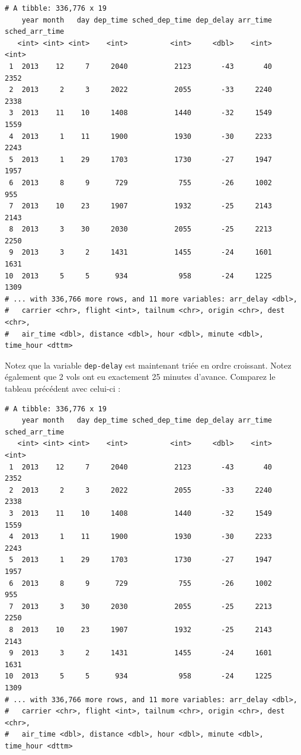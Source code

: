 \documentclass[a4paperpaper,]{article}
\newenvironment{Shaded}{\begin{snugshade}}{\end{snugshade}}
\newcommand{\KeywordTok}[1]{\textcolor[rgb]{0.13,0.29,0.53}{\textbf{#1}}}
\newcommand{\StringTok}[1]{\textcolor[rgb]{0.31,0.60,0.02}{#1}}
\newcommand{\OperatorTok}[1]{\textcolor[rgb]{0.81,0.36,0.00}{\textbf{#1}}}
\newcommand{\NormalTok}[1]{#1}
\theoremstyle{definition}
\theoremstyle{definition}
\theoremstyle{definition}
\theoremstyle{remark}
\begin{document}
\begin{verbatim}
# A tibble: 336,776 x 19
    year month   day dep_time sched_dep_time dep_delay arr_time sched_arr_time
   <int> <int> <int>    <int>          <int>     <dbl>    <int>          <int>
 1  2013    12     7     2040           2123       -43       40           2352
 2  2013     2     3     2022           2055       -33     2240           2338
 3  2013    11    10     1408           1440       -32     1549           1559
 4  2013     1    11     1900           1930       -30     2233           2243
 5  2013     1    29     1703           1730       -27     1947           1957
 6  2013     8     9      729            755       -26     1002            955
 7  2013    10    23     1907           1932       -25     2143           2143
 8  2013     3    30     2030           2055       -25     2213           2250
 9  2013     3     2     1431           1455       -24     1601           1631
10  2013     5     5      934            958       -24     1225           1309
# ... with 336,766 more rows, and 11 more variables: arr_delay <dbl>,
#   carrier <chr>, flight <int>, tailnum <chr>, origin <chr>, dest <chr>,
#   air_time <dbl>, distance <dbl>, hour <dbl>, minute <dbl>, time_hour <dttm>
\end{verbatim}

Notez que la variable \texttt{dep-delay} est maintenant triée en ordre
croissant. Notez également que 2 vols ont eu exactement 25 minutes
d'avance. Comparez le tableau précédent avec celui-ci :

\begin{Shaded}
\end{Shaded}

\begin{verbatim}
# A tibble: 336,776 x 19
    year month   day dep_time sched_dep_time dep_delay arr_time sched_arr_time
   <int> <int> <int>    <int>          <int>     <dbl>    <int>          <int>
 1  2013    12     7     2040           2123       -43       40           2352
 2  2013     2     3     2022           2055       -33     2240           2338
 3  2013    11    10     1408           1440       -32     1549           1559
 4  2013     1    11     1900           1930       -30     2233           2243
 5  2013     1    29     1703           1730       -27     1947           1957
 6  2013     8     9      729            755       -26     1002            955
 7  2013     3    30     2030           2055       -25     2213           2250
 8  2013    10    23     1907           1932       -25     2143           2143
 9  2013     3     2     1431           1455       -24     1601           1631
10  2013     5     5      934            958       -24     1225           1309
# ... with 336,766 more rows, and 11 more variables: arr_delay <dbl>,
#   carrier <chr>, flight <int>, tailnum <chr>, origin <chr>, dest <chr>,
#   air_time <dbl>, distance <dbl>, hour <dbl>, minute <dbl>, time_hour <dttm>
\end{verbatim}
\end{document}
